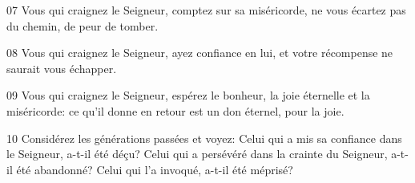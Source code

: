 
07 Vous qui craignez le Seigneur, comptez sur sa miséricorde, ne vous écartez pas du chemin, de peur de tomber.

08 Vous qui craignez le Seigneur, ayez confiance en lui, et votre récompense ne saurait vous échapper.

09 Vous qui craignez le Seigneur, espérez le bonheur, la joie éternelle et la miséricorde: ce qu’il donne en retour est un don éternel, pour la joie.

10 Considérez les générations passées et voyez: Celui qui a mis sa confiance dans le Seigneur, a-t-il été déçu? Celui qui a persévéré dans la crainte du Seigneur, a-t-il été abandonné? Celui qui l’a invoqué, a-t-il été méprisé?

